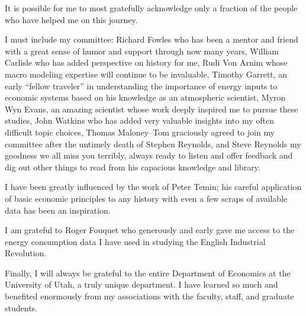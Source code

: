 \iffalse
{\footnotesize\em This page is optional.
It's in the table of contents and it's labeled 'ACKNOWLEDGMENTS' even
though the spelling `ACKNOWLEDGEMENTS' is also correct.
This page should be at the end of the preface, if one exists, or a
separate page, if no preface is used.}
\fi

\iffalse
Recognize faculty, friends, family but not the typist, editor or persons
paid to produce the manuscript from draft copy. Recognize funding,
special permission to reproduce figures and copyrighted material.
\fi

	It is possible for me to most gratefully acknowledge only a fraction of the people who have helped me on this journey.
	
	I must include my committee: Richard Fowles who has been a mentor and friend with a great sense of humor and support through now many years, William Carlisle who has added perspective on history for me, Rudi Von Arnim whose macro modeling expertise will continue to be invaluable, Timothy Garrett, an early ``fellow traveler'' in understanding the importance of energy inputs to economic systems based on his knowledge as an atmospheric scientist, Myron Wyn Evans, an amazing scientist whose work deeply inspired me to pursue these studies, John Watkins who has added very valuable insights into my often difficult topic choices, Thomas Maloney--Tom graciously agreed to join my committee after the untimely death of Stephen Reynolds, and Steve Reynolds my goodness we all miss you terribly, always ready to listen and offer feedback and dig out other things to read from his capacious knowledge and library.
	
	I have been greatly influenced by the work of Peter Temin; his careful application of basic economic principles to any history with even a few scraps of available data has been an inspiration.
	
	I am grateful to Roger Fouquet who generously and early gave me access to the energy consumption data I have used in studying the English Industrial Revolution.
	
	Finally, I will always be grateful to the entire Department of Economics at the University of Utah, a truly unique department. I have learned so much and benefited enormously from my associations with the faculty, staff, and graduate students.